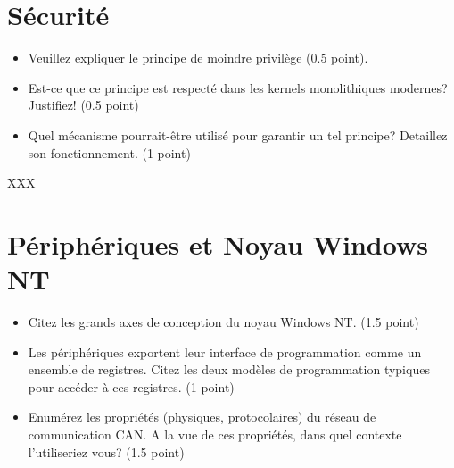% 
%

\section{S\'ecurit\'e
         }


\begin{itemize}
  \item
    Veuillez expliquer le principe de moindre privil\`ege (0.5 point).
  \item
    Est-ce que ce principe est respect\'e dans les kernels monolithiques
    modernes? Justifiez! (0.5 point)
  \item
    Quel m\'ecanisme pourrait-\^etre utilis\'e pour garantir un tel principe?
    Detaillez son fonctionnement. (1 point)
\end{itemize}

\begin{correction}

XXX

\end{correction}

%
%

\section{P\'eriph\'eriques et Noyau Windows NT
         }

\begin{itemize}
  \item
    Citez les grands axes de conception du noyau Windows NT. (1.5 point)
  \item
    Les p\'eriph\'eriques exportent leur interface de programmation comme
    un ensemble de registres. Citez les deux mod\`eles de programmation
    typiques pour acc\'eder \`a ces registres. (1 point)
  \item
    Enum\'erez les propri\'et\'es (physiques, protocolaires) du r\'eseau de
    communication CAN. A la vue de ces propri\'et\'es, dans quel contexte
    l'utiliseriez vous? (1.5 point)
\end{itemize}

